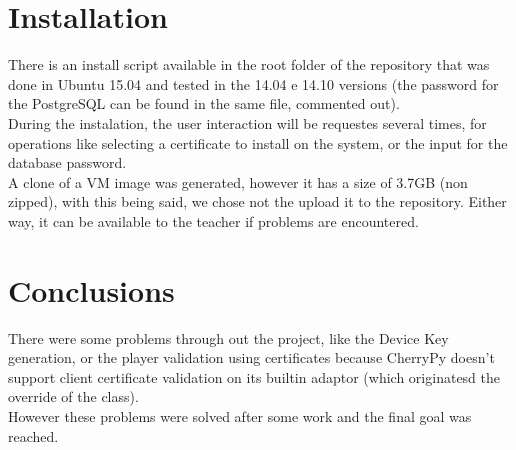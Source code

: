 \documentclass[11pt,a4paper]{report}
\begin{document}
\chapter{Installation}

There is an install script available in the root folder of the repository that was done in Ubuntu 15.04 and tested in the 14.04 e 14.10 versions (the password for the PostgreSQL can be found in the same file, commented out).\\

During the instalation, the user interaction will be requestes several times, for operations like selecting a certificate to install on the system, or the input for the database password.\\

A clone of a VM image was generated, however it has a size of 3.7GB (non zipped), with this being said, we chose not the upload it to the repository. Either way, it can be available to the teacher if problems are encountered.

\chapter{Conclusions}

There were some problems through out the project, like the Device Key generation, or the player validation using certificates because CherryPy doesn't support client certificate validation on its builtin adaptor (which originatesd the override of the class).\\

However these problems were solved after some work and the final goal was reached. 





\end{document}
